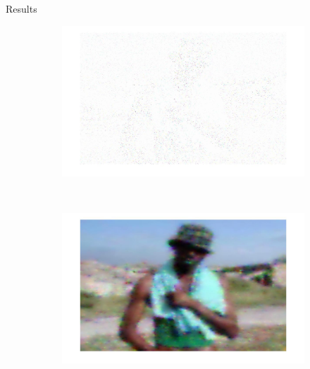 \documentclass[11pt]{beamer}
\begin{document}
\begin{frame}{Results}
\begin{figure}
    \centering
    \begin{subfigure}[b]{0.5\textwidth}
        \includegraphics[width=\textwidth]{image6_toRestore_pres}

    \end{subfigure}
    ~ 
        \begin{subfigure}[b]{0.6\textwidth}
        \includegraphics[width=\textwidth]{image6_Restored_pres}

    \end{subfigure}

\end{figure}

\end{frame}
\end{document}
